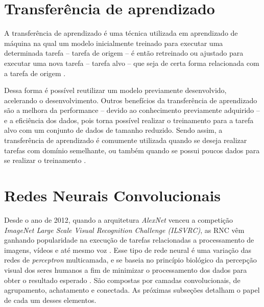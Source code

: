 \section{Transferência de aprendizado}
A transferência de aprendizado é uma técnica utilizada em aprendizado de máquina na qual um modelo inicialmente treinado para executar uma determinada tarefa -- tarefa de origem -- é então retreinado ou ajustado para executar uma nova tarefa -- tarefa alvo -- que seja de certa forma relacionada
com a tarefa de origem \cite{torrey2010transfer}. 

Dessa forma é possível reutilizar um modelo previamente desenvolvido, acelerando o desenvolvimento. Outros benefícios da transferência de aprendizado são a melhora da performance -- devido ao conhecimento previamente adquirido -- e a eficiência dos dados, pois torna possível realizar o treinamento para a tarefa alvo com um conjunto de dados de tamanho reduzido. Sendo assim, a transferência de aprendizado é comumente utilizada quando se deseja realizar tarefas com domínio semelhante, ou também quando se possui poucos dados para se realizar o treinamento \cite{torrey2010transfer}. 


\section{Redes Neurais Convolucionais}

Desde o ano de 2012, quando a arquitetura \textit{AlexNet} venceu a competição \textit{ImageNet Large Scale Visual Recognition Challenge (ILSVRC)}, as \acf{RNC} vêm ganhando popularidade na execução de tarefas relacionadas a processamento de imagens, vídeos e até mesmo voz \cite{vargas2016estudo}.
Esse tipo de rede neural é uma variação das redes de \textit{perceptron} multicamada, e se baseia no princípio biológico da percepção visual dos seres humanos a fim de minimizar o processamento dos dados para obter o resultado esperado \cite{mueller2019deep}. São compostas por camadas convolucionais, de agrupamento, achatamento e conectada. As próximas subseções detalham o papel de cada um desses elementos.

